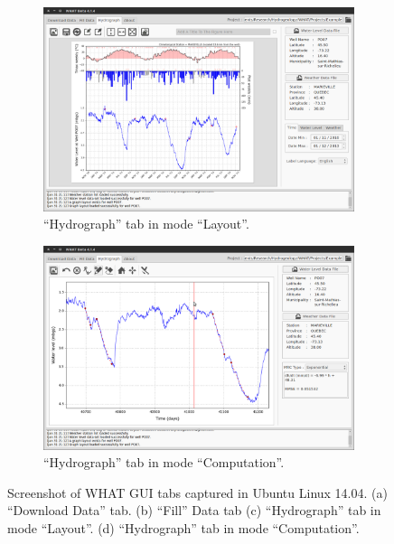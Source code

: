 \documentclass[WHATMANUAL.tex]{subfiles}
\begin{document}
\begin{figure}[!ht]
\begin{subfigure}[t]{0.45\textwidth}
                \includegraphics[width=\textwidth]{img/WHAT_Screenshot002}
                \caption{``Hydrograph'' tab in mode ``Layout''.}
                \label{subfig:ScnShot_002}
        \end{subfigure}
        \hspace{0.5cm}
        \begin{subfigure}[t]{0.45\textwidth}
                \includegraphics[width=\textwidth]{img/WHAT_Screenshot003}
                \caption{``Hydrograph'' tab in mode ``Computation''.}
                \label{subfig:ScnShot_003}
        \end{subfigure}
        \caption[Screenshots of WHAT GUI tabs captured in Ubuntu Linux 14.04.]{Screenshot of WHAT GUI tabs captured in Ubuntu Linux 14.04. (a) ``Download Data'' tab. (b) ``Fill'' Data tab (c) ``Hydrograph'' tab in mode ``Layout''. (d) ``Hydrograph'' tab in mode ``Computation''.}\label{fig:WHAT_GUI_ScnShot}
\end{figure}
\end{document}
